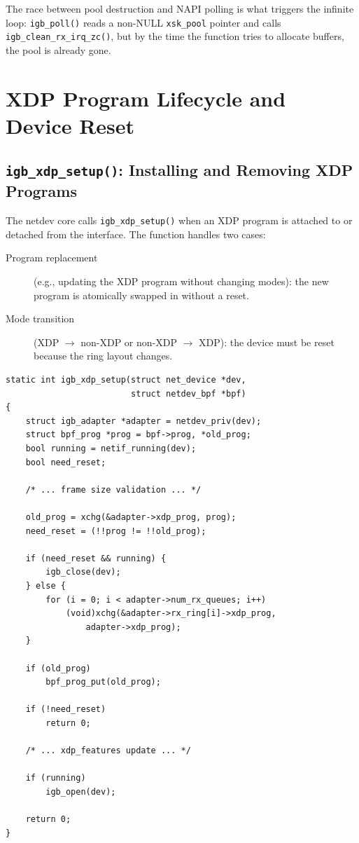 \documentclass[11pt,a4paper,openany]{book}
\newcommand{\func}[1]{\texttt{#1()}}
\newcommand{\sym}[1]{\texttt{#1}}
\begin{document}
The race between pool destruction and NAPI polling is what triggers
the infinite loop: \func{igb\_poll} reads a non-NULL \sym{xsk\_pool}
pointer and calls \func{igb\_clean\_rx\_irq\_zc}, but by the time the
function tries to allocate buffers, the pool is already gone.


\chapter{XDP Program Lifecycle and Device Reset}
\label{ch:xdp-lifecycle}

\section{\texttt{igb\_xdp\_setup()}: Installing and Removing XDP Programs}
\label{sec:xdp-setup}

The netdev core calls \func{igb\_xdp\_setup} when an XDP program is
attached to or detached from the interface.  The function handles two
cases:

\begin{description}
\item[Program replacement] (e.g., updating the XDP program without
    changing modes): the new program is atomically swapped in without
    a reset.
\item[Mode transition] (XDP $\to$ non-XDP or non-XDP $\to$ XDP): the
    device must be reset because the ring layout changes.
\end{description}

\begin{lstlisting}[caption={\texttt{igb\_xdp\_setup()} (igb\_main.c:2890)},
    label=lst:xdp-setup]
static int igb_xdp_setup(struct net_device *dev,
                         struct netdev_bpf *bpf)
{
    struct igb_adapter *adapter = netdev_priv(dev);
    struct bpf_prog *prog = bpf->prog, *old_prog;
    bool running = netif_running(dev);
    bool need_reset;

    /* ... frame size validation ... */

    old_prog = xchg(&adapter->xdp_prog, prog);
    need_reset = (!!prog != !!old_prog);

    if (need_reset && running) {
        igb_close(dev);
    } else {
        for (i = 0; i < adapter->num_rx_queues; i++)
            (void)xchg(&adapter->rx_ring[i]->xdp_prog,
                adapter->xdp_prog);
    }

    if (old_prog)
        bpf_prog_put(old_prog);

    if (!need_reset)
        return 0;

    /* ... xdp_features update ... */

    if (running)
        igb_open(dev);

    return 0;
}
\end{lstlisting}
\end{document}
